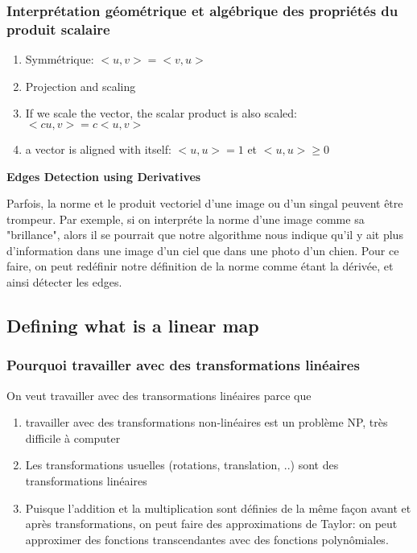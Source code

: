 \documentclass{article}
\begin{document}
\subsubsection{Interprétation géométrique et algébrique des propriétés
du produit scalaire}

\begin{enumerate}
    \item Symmétrique: $ <u,v> = <v,u>$
    \item Projection and scaling
    \item If we scale the vector, the scalar product is also scaled:
	$ <cu, v> = c <u,v> $
    \item a vector is aligned with itself: $ <u,u> = 1$ et $ <u,u> \geq 0$
\end{enumerate}

\textbf{Edges Detection using Derivatives}

Parfois, la norme et le produit vectoriel d'une image ou d'un singal
peuvent être trompeur. Par exemple, si on interpréte la norme d'une image
comme sa "brillance", alors il se pourrait que notre algorithme nous
indique qu'il y ait plus d'information dans une image d'un ciel que dans
une photo d'un chien. Pour ce faire, on peut redéfinir notre définition
de la norme comme étant la dérivée, et ainsi détecter les edges.

\subsection{Defining what is a linear map}

\subsubsection{Pourquoi travailler avec des transformations linéaires}

On veut travailler avec des transormations linéaires parce que
\begin{enumerate}
    \item travailler avec des transformations non-linéaires est un
	problème NP, très difficile à computer
    \item Les transformations usuelles
	(rotations, translation, ..) sont des transformations linéaires
    \item Puisque l'addition et la multiplication sont définies de la
	même façon avant et après transformations, on peut faire des
	approximations de Taylor: on peut approximer des fonctions
	transcendantes avec des fonctions polynômiales.
\end{enumerate}
\end{document}
